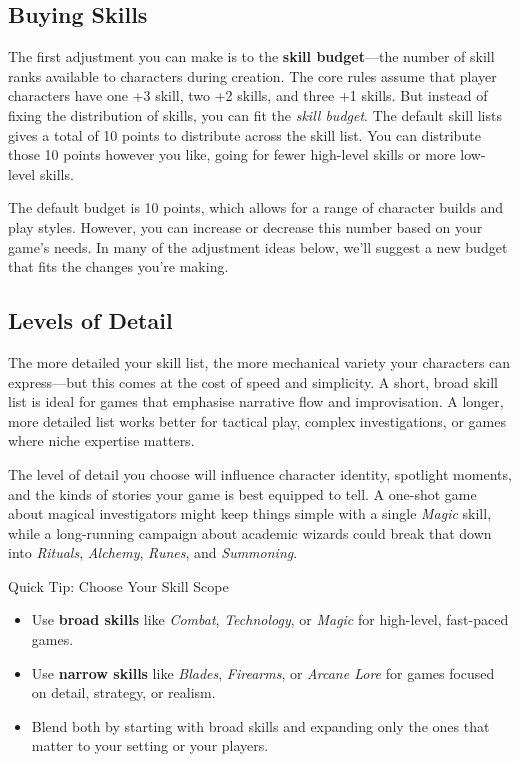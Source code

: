 \subsection{Buying Skills}

The first adjustment you can make is to the \textbf{skill budget}—the number of skill ranks available to characters during creation. The core rules assume that player characters have one +3 skill, two +2 skills, and three +1 skills. But instead of fixing the distribution of skills, you can fit the \emph{skill budget}. The default skill lists gives a total of 10 points to distribute across the skill list. You can distribute those 10 points however you like, going for fewer high-level skills or more low-level skills. 

The default budget is 10 points, which allows for a range of character builds and play styles. However, you can increase or decrease this number based on your game’s needs. In many of the adjustment ideas below, we’ll suggest a new budget that fits the changes you’re making.

\subsection{Levels of Detail}\label{toolbox:detailed-skill-lists}

The more detailed your skill list, the more mechanical variety your characters can express—but this comes at the cost of speed and simplicity. A short, broad skill list is ideal for games that emphasise narrative flow and improvisation. A longer, more detailed list works better for tactical play, complex investigations, or games where niche expertise matters.

The level of detail you choose will influence character identity, spotlight moments, and the kinds of stories your game is best equipped to tell. A one-shot game about magical investigators might keep things simple with a single \textit{Magic} skill, while a long-running campaign about academic wizards could break that down into \textit{Rituals}, \textit{Alchemy}, \textit{Runes}, and \textit{Summoning}.

\begin{CommentBox}{Quick Tip: Choose Your Skill Scope}
    \begin{itemize}
        \item Use \textbf{broad skills} like \textit{Combat}, \textit{Technology}, or \textit{Magic} for high-level, fast-paced games.
        \item Use \textbf{narrow skills} like \textit{Blades}, \textit{Firearms}, or \textit{Arcane Lore} for games focused on detail, strategy, or realism.
        \item Blend both by starting with broad skills and expanding only the ones that matter to your setting or your players.
    \end{itemize}
\end{CommentBox}

